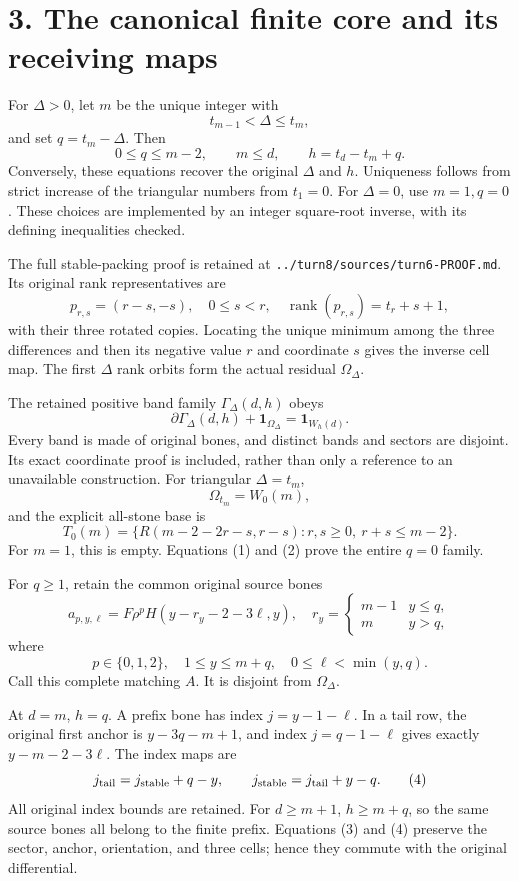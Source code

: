 \documentclass[
  11pt,
]{article}
\begin{document}
\section{3. The canonical finite core and its receiving
maps}\label{the-canonical-finite-core-and-its-receiving-maps}

For \(\Delta>0\), let \(m\) be the unique integer with \[
 t_{m-1}<\Delta\le t_m,
\] and set \(q=t_m-\Delta\). Then \[
 0\le q\le m-2,\qquad m\le d,\qquad
 h=t_d-t_m+q.
\] Conversely, these equations recover the original \(\Delta\) and
\(h\). Uniqueness follows from strict increase of the triangular numbers
from \(t_1=0\). For \(\Delta=0\), use \(m=1,q=0\). These choices are
implemented by an integer square-root inverse, with its defining
inequalities checked.

The full stable-packing proof is retained at
\texttt{../turn8/sources/turn6-PROOF.md}. Its original rank
representatives are \[
 p_{r,s}=(r-s,-s),\quad 0\le s<r,\quad
 \operatorname{rank}(p_{r,s})=t_r+s+1,
\] with their three rotated copies. Locating the unique minimum among
the three differences and then its negative value \(r\) and coordinate
\(s\) gives the inverse cell map. The first \(\Delta\) rank orbits form
the actual residual \(\Omega_\Delta\).

The retained positive band family \(\Gamma_\Delta(d,h)\) obeys \[
 \partial\Gamma_\Delta(d,h)+\mathbf1_{\Omega_\Delta}
 =\mathbf1_{W_h(d)}.                                      \tag{1}
\] Every band is made of original bones, and distinct bands and sectors
are disjoint. Its exact coordinate proof is included, rather than only a
reference to an unavailable construction. For triangular \(\Delta=t_m\),
\[
 \Omega_{t_m}=W_0(m),
\] and the explicit all-stone base is \[
 T_0(m)=\{R(m-2-2r-s,r-s):r,s\ge0,\ r+s\le m-2\}.          \tag{2}
\] For \(m=1\), this is empty. Equations (1) and (2) prove the entire
\(q=0\) family.

For \(q\ge1\), retain the common original source bones \[
 a_{p,y,\ell}=F\rho^pH(y-r_y-2-3\ell,y),
\quad
 r_y=\begin{cases}m-1&y\le q,\\m&y>q,\end{cases}            \tag{3}
\] where \[
 p\in\{0,1,2\},\quad1\le y\le m+q,\quad
 0\le\ell<\min(y,q).
\] Call this complete matching \(A\). It is disjoint from
\(\Omega_\Delta\).

At \(d=m\), \(h=q\). A prefix bone has index \(j=y-1-\ell\). In a tail
row, the original first anchor is \(y-3q-m+1\), and index \(j=q-1-\ell\)
gives exactly \(y-m-2-3\ell\). The index maps are \[
 j_{\rm tail}=j_{\rm stable}+q-y,
 \qquad j_{\rm stable}=j_{\rm tail}+y-q.                    \tag{4}
\] All original index bounds are retained. For \(d\ge m+1\),
\(h\ge m+q\), so the same source bones all belong to the finite prefix.
Equations (3) and (4) preserve the sector, anchor, orientation, and
three cells; hence they commute with the original differential.
\end{document}
